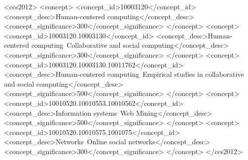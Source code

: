 \documentclass[nonacm,acmsmall,screen,letterpaper]{acmart}
\begin{document}
\begin{CCSXML}
<ccs2012>
<concept>
<concept_id>10003120</concept_id>
<concept_desc>Human-centered computing</concept_desc>
<concept_significance>300</concept_significance>
</concept>
<concept>
<concept_id>10003120.10003130</concept_id>
<concept_desc>Human-centered computing~Collaborative and social computing</concept_desc>
<concept_significance>300</concept_significance>
</concept>
<concept>
<concept_id>10003120.10003130.10011762</concept_id>
<concept_desc>Human-centered computing~Empirical studies in collaborative and social computing</concept_desc>
<concept_significance>500</concept_significance>
</concept>
 <concept>
  <concept_id>10010520.10010553.10010562</concept_id>
  <concept_desc>Information systems~Web Mining</concept_desc>
  <concept_significance>500</concept_significance>
 </concept>
  <concept>
  <concept_id>10010520.10010575.1001075</concept_id>
  <concept_desc>Networks~Online social networks</concept_desc>
  <concept_significance>300</concept_significance>
 </concept>
</ccs2012>
\end{CCSXML}



\maketitle






%
%
%
%



%
%
%







\appendix

\end{document}
